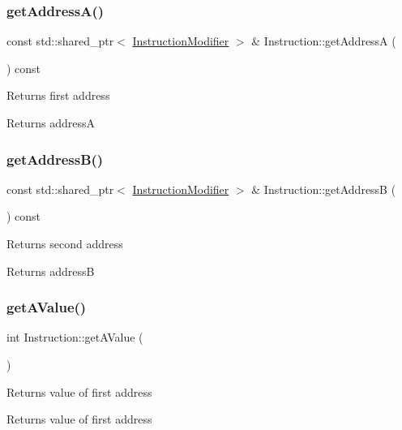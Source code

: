 \subsubsection{\texorpdfstring{get\+Address\+A()}{getAddressA()}}
{\footnotesize\ttfamily const std\+::shared\+\_\+ptr$<$ \hyperlink{classInstructionModifier}{Instruction\+Modifier} $>$ \& Instruction\+::get\+AddressA (\begin{DoxyParamCaption}{ }\end{DoxyParamCaption}) const}

Returns first address \begin{DoxyReturn}{Returns}
addressA 
\end{DoxyReturn}
\mbox{\label{classInstruction_a587656e972cb049fe5cd22159451d508}} 
\subsubsection{\texorpdfstring{get\+Address\+B()}{getAddressB()}}
{\footnotesize\ttfamily const std\+::shared\+\_\+ptr$<$ \hyperlink{classInstructionModifier}{Instruction\+Modifier} $>$ \& Instruction\+::get\+AddressB (\begin{DoxyParamCaption}{ }\end{DoxyParamCaption}) const}

Returns second address \begin{DoxyReturn}{Returns}
addressB 
\end{DoxyReturn}
\mbox{\label{classInstruction_a86228a629fcccffffeb73b9b17201864}} 
\subsubsection{\texorpdfstring{get\+A\+Value()}{getAValue()}}
{\footnotesize\ttfamily int Instruction\+::get\+A\+Value (\begin{DoxyParamCaption}{ }\end{DoxyParamCaption})}

Returns value of first address \begin{DoxyReturn}{Returns}
value of first address 
\end{DoxyReturn}
\mbox{\label{classInstruction_a02e899031bb2cb33d6e09bcfce3f9569}} 
